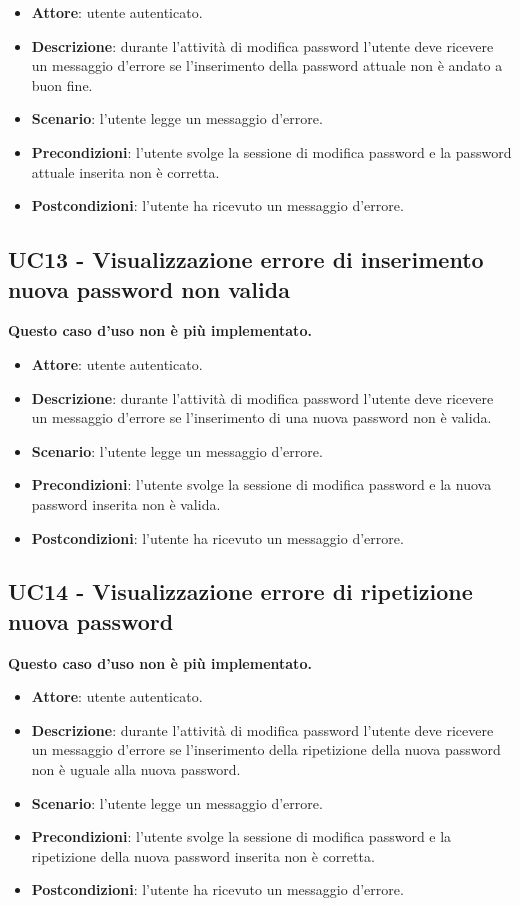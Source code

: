 \begin{itemize}
    \item \textbf{Attore}: utente autenticato.
    \item \textbf{Descrizione}: durante l'attività di modifica password l'utente deve ricevere un messaggio d'errore se l'inserimento della password attuale non è andato a buon fine.
    \item \textbf{Scenario}: l'utente legge un messaggio d'errore. 
    \item \textbf{Precondizioni}: l'utente svolge la sessione di modifica password e la password attuale inserita non è corretta.
    \item \textbf{Postcondizioni}: l'utente ha ricevuto un messaggio d'errore.
\end{itemize}

\subsection{UC13 - Visualizzazione errore di inserimento nuova password non valida}
\textbf{Questo caso d'uso non è più implementato.}

\begin{itemize}
    \item \textbf{Attore}: utente autenticato.
    \item \textbf{Descrizione}: durante l'attività di modifica password l'utente deve ricevere un messaggio d'errore se l'inserimento di una nuova password non è valida.
    \item \textbf{Scenario}: l'utente legge un messaggio d'errore. 
    \item \textbf{Precondizioni}: l'utente svolge la sessione di modifica password e la nuova password inserita non è valida.
    \item \textbf{Postcondizioni}: l'utente ha ricevuto un messaggio d'errore.

\end{itemize}

\subsection{UC14 - Visualizzazione errore di ripetizione nuova password}
\textbf{Questo caso d'uso non è più implementato.}

\begin{itemize}
    \item \textbf{Attore}: utente autenticato.
    \item \textbf{Descrizione}: durante l'attività di modifica password l'utente deve ricevere un messaggio d'errore se l'inserimento della ripetizione della nuova password non è uguale alla nuova password.
    \item \textbf{Scenario}: l'utente legge un messaggio d'errore. 
    \item \textbf{Precondizioni}: l'utente svolge la sessione di modifica password e la ripetizione della nuova password inserita non è corretta.
    \item \textbf{Postcondizioni}: l'utente ha ricevuto un messaggio d'errore.
\end{itemize}

